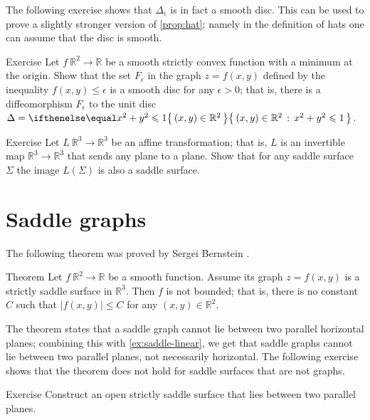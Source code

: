 The following exercise shows that $\Delta_\epsilon$ is in fact a smooth disc.
This can be used to prove a slightly stronger version of \ref{prop:hat};
namely in the definition of hats one can assume that the disc is smooth.

\begin{thm}{Exercise}\label{ex:disc-hat}
Let $f\:\mathbb{R}^2\to\mathbb{R}$ be a smooth strictly convex function with a minimum at the origin.
Show that the set $F_\epsilon$ in the graph $z=f(x,y)$ defined by the inequality $f(x,y)\le \epsilon$ is a smooth disc for any $\epsilon>0$;
that is, there is a diffeomorphism 
$F_\epsilon$ to the unit disc $\Delta\z=\set{(x,y)\in\mathbb{R}^2}{x^2+y^2\le 1}$.
\end{thm}

\begin{thm}{Exercise}\label{ex:saddle-linear}
Let $L\:\mathbb{R}^3\to\mathbb{R}^3$ be an affine transformation; that is, $L$ is an invertible map $\mathbb{R}^3\to\mathbb{R}^3$ that sends any plane to a plane. 
Show that for any saddle surface $\Sigma$ the image $L(\Sigma)$ is also a saddle surface.
\end{thm}



\section{Saddle graphs}

The following theorem was proved by Sergei Bernstein \cite{bernstein}.

\begin{thm}{Theorem}\label{thm:bernshtein}
Let $f\:\mathbb{R}^2\to\mathbb{R}$ be a smooth function.
Assume its graph $z=f(x,y)$ is a strictly saddle surface in $\mathbb{R}^3$.
Then $f$ is not bounded;
that is, there is no constant $C$ such that 
$|f(x,y)|\le C$ for any $(x,y)\in\mathbb{R}^2$.
\end{thm}

The theorem states that a saddle graph cannot lie between two parallel horizontal planes;
combining this with \ref{ex:saddle-linear}, we get that saddle graphs cannot lie between two parallel planes,
not necessarily horizontal.
The following exercise shows that the theorem does not hold for saddle surfaces that are not graphs.


\begin{thm}{Exercise}\label{ex:between-parallels}
Construct an open strictly saddle surface that lies between two parallel planes.
\end{thm}

